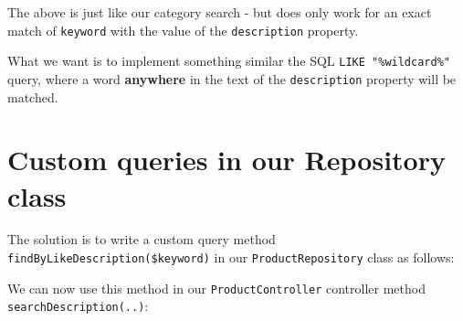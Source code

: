 \documentclass[a4paperpaper,openright]{book}
\newenvironment{Shaded}{}{}
\newcommand{\AnnotationTok}[1]{\textcolor[rgb]{0.38,0.63,0.69}{\textbf{\textit{#1}}}}
\newcommand{\CommentTok}[1]{\textcolor[rgb]{0.38,0.63,0.69}{\textit{#1}}}
\newcommand{\KeywordTok}[1]{\textcolor[rgb]{0.00,0.44,0.13}{\textbf{#1}}}
\newcommand{\NormalTok}[1]{#1}
\newcommand{\OtherTok}[1]{\textcolor[rgb]{0.00,0.44,0.13}{#1}}
\newcommand{\StringTok}[1]{\textcolor[rgb]{0.25,0.44,0.63}{#1}}
\begin{document}
The above is just like our category search - but does only work for an
exact match of \texttt{keyword} with the value of the
\texttt{description} property.

What we want is to implement something similar the SQL
\texttt{LIKE\ "\%wildcard\%"} query, where a word \textbf{anywhere} in
the text of the \texttt{description} property will be matched.

\hypertarget{custom-queries-in-our-repository-class}{%
\section{Custom queries in our Repository
class}\label{custom-queries-in-our-repository-class}}

The solution is to write a custom query method
\texttt{findByLikeDescription(\$keyword)} in our
\texttt{ProductRepository} class as follows:

\begin{Shaded}
\end{Shaded}

We can now use this method in our \texttt{ProductController} controller
method \texttt{searchDescription(..)}:

\begin{Shaded}
\end{Shaded}
\end{document}
